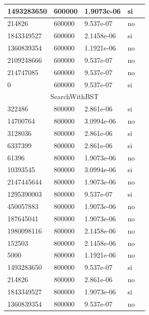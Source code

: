 \documentclass[12pt, fleqn]{article}                             %
\theoremstyle{break}                                            %
\begin{document}
\begin{longtable}{|m{5em}|m{5em}|m{10em}|m{5em}|@{}m{0pt}@{}}
            1493283650& 600000  & 1.9073e-06 & si &\\[1em]    \hline
            214826& 600000  & 9.537e-07 & no &\\[1em]    \hline
            1843349527& 600000  & 2.1458e-06 & si &\\[1em]    \hline
            1360839354& 600000  & 1.1921e-06 & no &\\[1em]    \hline
            2109248666& 600000  & 9.537e-07 & no &\\[1em]    \hline
            214747085& 600000  & 9.537e-07 & no &\\[1em]    \hline
            0& 600000  & 9.537e-07 & si &\\[1em]    \hline
            \multicolumn{5}{|c|}{SearchWithBST}   \\          \hline
            322486& 800000  & 2.861e-06 & si &\\[1em]    \hline
            14700764& 800000  & 3.0994e-06 & no &\\[1em]    \hline
            3128036& 800000  & 2.861e-06 & si &\\[1em]    \hline
            6337399& 800000  & 2.861e-06 & si &\\[1em]    \hline
            61396& 800000  & 1.9073e-06 & no &\\[1em]    \hline
            10393545& 800000  & 3.0994e-06 & si &\\[1em]    \hline
            2147445644& 800000  & 1.9073e-06 & no &\\[1em]    \hline
            1295390003& 800000  & 9.537e-07 & si &\\[1em]    \hline
            450057883& 800000  & 1.9073e-06 & no &\\[1em]    \hline
            187645041& 800000  & 1.9073e-06 & no &\\[1em]    \hline
            1980098116& 800000  & 2.1458e-06 & no &\\[1em]    \hline
            152503& 800000  & 2.1458e-06 & no &\\[1em]    \hline
            5000& 800000  & 1.1921e-06 & no &\\[1em]    \hline
            1493283650& 800000  & 9.537e-07 & si &\\[1em]    \hline
            214826& 800000  & 2.861e-06 & no &\\[1em]    \hline
            1843349527& 800000  & 1.9073e-06 & si &\\[1em]    \hline
            1360839354& 800000  & 9.537e-07 & no &\\[1em]    \hline

\end{longtable}
\end{document}
